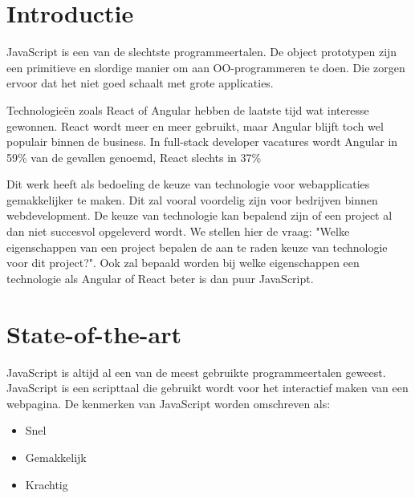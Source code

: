 
\section{Introductie} %
\label{sec:introductie}

JavaScript is een van de slechtste programmeertalen. De object prototypen zijn een primitieve en slordige manier om aan OO-programmeren te doen. Die zorgen ervoor dat het niet goed schaalt met grote applicaties. \autocite{Eng2016} 

Technologieën zoals React of Angular hebben de laatste tijd wat interesse gewonnen. React wordt meer en meer gebruikt, maar Angular blijft toch wel populair binnen de business. In full-stack developer vacatures wordt Angular in 59\% van de gevallen genoemd, React slechts in 37\% \autocite{Schlothauer2019}

Dit werk heeft als bedoeling de keuze van technologie voor webapplicaties gemakkelijker te maken. Dit zal vooral voordelig zijn voor bedrijven binnen webdevelopment. De keuze van technologie kan bepalend zijn of een project al dan niet succesvol opgeleverd wordt. We stellen hier de vraag: "Welke eigenschappen van een project bepalen de aan te raden keuze van technologie voor dit project?". Ook zal bepaald worden bij welke eigenschappen een technologie als Angular of React beter is dan puur JavaScript.





\section{State-of-the-art}
\label{sec:state-of-the-art}

JavaScript is altijd al een van de meest gebruikte programmeertalen geweest. JavaScript is een scripttaal die gebruikt wordt voor het interactief maken van een webpagina. De kenmerken van JavaScript worden omschreven als:
\begin{itemize}
	\item Snel
	\item Gemakkelijk
	\item Krachtig
\end{itemize}
\autocite{Garbadge2018}

